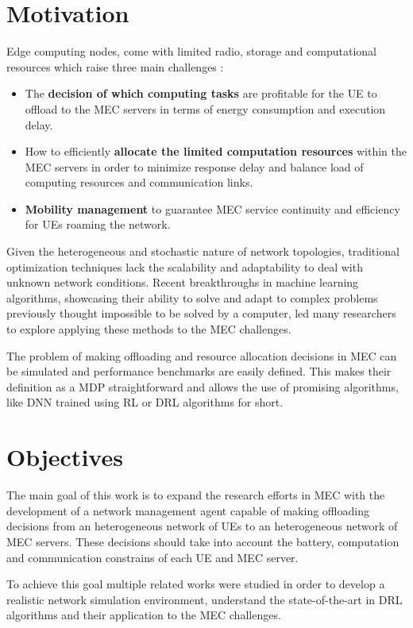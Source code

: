 \clearpage

\section{Motivation}
\noindent Edge computing nodes, come with limited radio, storage and computational resources which raise three main challenges \cite{SHAKARAMI2020107496}:
\begin{itemize}
    \item The \textbf{decision of which computing tasks} are profitable for the \acrshort{UE} to offload to the \acrshort{MEC} servers in terms of energy consumption and execution delay.
    \item How to efficiently \textbf{allocate the limited computation resources} within the \acrshort{MEC} servers in order to minimize response delay and balance load of computing resources and communication links.
    \item \textbf{Mobility management} to guarantee \acrshort{MEC} service continuity and efficiency for \acrshort{UE}s roaming the network.
\end{itemize}

Given the heterogeneous and stochastic nature of network topologies, traditional optimization techniques lack the scalability and adaptability to deal with unknown network conditions. Recent breakthroughs in machine learning algorithms, showcasing their ability to solve and adapt to complex problems previously thought impossible to be solved by a computer, led many researchers to explore applying these methods to the \acrshort{MEC} challenges.
\par
The problem of making offloading and resource allocation decisions in \acrshort{MEC} can be simulated and performance benchmarks are easily defined. This makes their definition as a \acrfull{MDP} straightforward and allows the use of promising algorithms, like \acrfull{DNN} trained using \acrfull{RL} or \acrfull{DRL} algorithms for short. 

\section{Objectives}
\noindent The main goal of this work is to expand the research efforts in \acrshort{MEC} with the development of a network management agent capable of making offloading decisions from an heterogeneous network of \acrshort{UE}s to an heterogeneous network of \acrshort{MEC} servers. These decisions should take into account the battery, computation and communication constrains of each \acrshort{UE} and \acrshort{MEC} server.
\par
To achieve this goal multiple related works were studied in order to develop a realistic network simulation environment, understand the state-of-the-art in \acrshort{DRL} algorithms and their application to the \acrshort{MEC} challenges.

